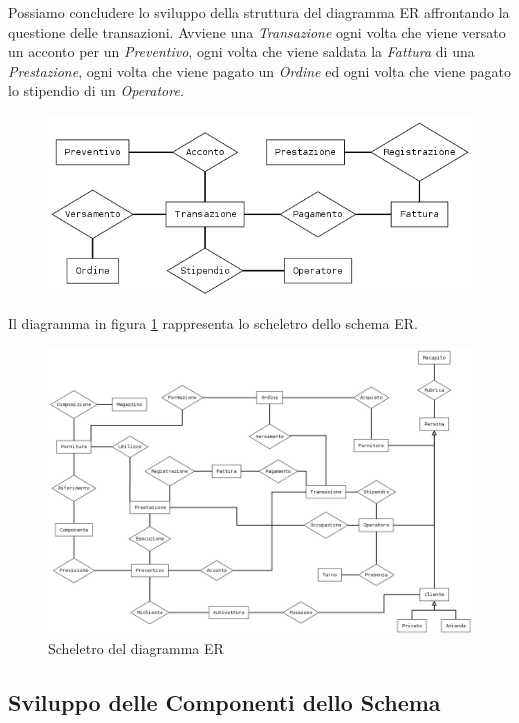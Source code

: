 		Possiamo concludere lo sviluppo della struttura del diagramma ER affrontando la questione delle transazioni. Avviene una \emph{Transazione} ogni volta che viene versato un acconto per un \emph{Preventivo}, ogni volta che viene saldata la \emph{Fattura} di una \emph{Prestazione}, ogni volta che viene pagato un \emph{Ordine} ed ogni volta che viene pagato lo stipendio di un \emph{Operatore}.
		
		\begin{figure}[H]
			\centering
			\includegraphics[width=12cm]{images/diagrams/transazione.png}
		\end{figure}
			
		Il diagramma in figura \ref{fig:scheletro_er} rappresenta lo scheletro dello schema ER.
		
		\begin{figure}
			\centering
			\includegraphics[width=22cm]{images/diagrams/schema.png}
			\caption{Scheletro del diagramma ER}
			\label{fig:scheletro_er}
		\end{figure}
	
	\subsection{Sviluppo delle Componenti dello Schema}
	
